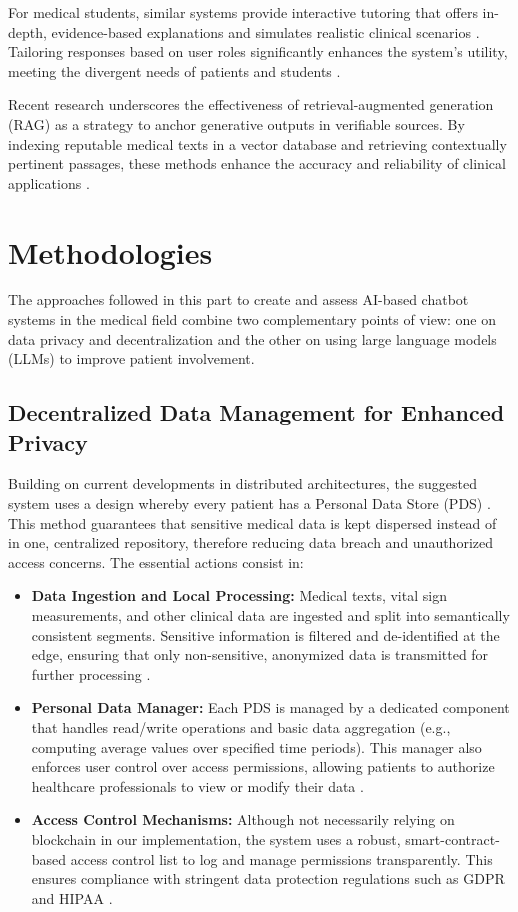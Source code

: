 For medical students, similar systems provide interactive tutoring that offers in-depth, evidence-based explanations and simulates realistic clinical scenarios \cite{dineen2019}. Tailoring responses based on user roles significantly enhances the system’s utility, meeting the divergent needs of patients and students \cite{montagna2023}.

Recent research underscores the effectiveness of retrieval-augmented generation (RAG) as a strategy to anchor generative outputs in verifiable sources. By indexing reputable medical texts in a vector database and retrieving contextually pertinent passages, these methods enhance the accuracy and reliability of clinical applications \cite{koopman2020}.

\section{Methodologies}
\label{sec:methodologies}

The approaches followed in this part to create and assess AI-based chatbot systems in the medical field combine two complementary points of view: one on data privacy and decentralization and the other on using large language models (LLMs) to improve patient involvement.

\subsection{Decentralized Data Management for Enhanced Privacy}
Building on current developments in distributed architectures, the suggested system uses a design whereby every patient has a Personal Data Store (PDS) \cite{zichichi2022}. This method guarantees that sensitive medical data is kept dispersed instead of in one, centralized repository, therefore reducing data breach and unauthorized access concerns. The essential actions consist in:
\begin{itemize}[itemsep=2em]
    \item \textbf{Data Ingestion and Local Processing:} Medical texts, vital sign measurements, and other clinical data are ingested and split into semantically consistent segments. Sensitive information is filtered and de-identified at the edge, ensuring that only non-sensitive, anonymized data is transmitted for further processing \cite{zichichi2020b}.
    \item \textbf{Personal Data Manager:} Each PDS is managed by a dedicated component that handles read/write operations and basic data aggregation (e.g., computing average values over specified time periods). This manager also enforces user control over access permissions, allowing patients to authorize healthcare professionals to view or modify their data \cite{zichichi2020a}.
    \item \textbf{Access Control Mechanisms:} Although not necessarily relying on blockchain in our implementation, the system uses a robust, smart-contract-based access control list to log and manage permissions transparently. This ensures compliance with stringent data protection regulations such as GDPR \cite{eu2016} and HIPAA \cite{hipaa1996}.
\end{itemize}

